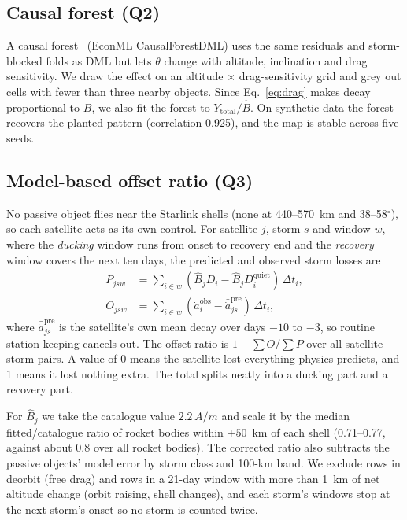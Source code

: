 \subsection{Causal forest (Q2)}
A causal forest~\cite{wager2018forest,athey2019grf} (EconML CausalForestDML) uses the same
residuals and storm-blocked folds as DML but lets $\theta$ change with altitude, inclination and
drag sensitivity. We draw the effect on an altitude $\times$ drag-sensitivity grid and grey out
cells with fewer than three nearby objects. Since Eq.~\eqref{eq:drag} makes decay proportional
to $B$, we also fit the forest to $Y_{\text{total}}/\hat B$. On synthetic data the forest recovers the planted pattern
(correlation 0.925), and the map is stable across five seeds.

\subsection{Model-based offset ratio (Q3)}
No passive object flies near the Starlink shells (none at 440--570~km and 38--58$^\circ$), so
each satellite acts as its own control. For satellite $j$, storm $s$ and
window $w$, where the \emph{ducking} window runs from onset to recovery end and the
\emph{recovery} window covers the next ten days, the predicted and observed storm losses are
\begin{align}
P_{jsw} &= \textstyle\sum_{i\in w} (\hat B_j D_i - \hat B_j D_i^{\text{quiet}})\,\Delta t_i,\\
O_{jsw} &= \textstyle\sum_{i\in w} (\dot a_i^{\text{obs}} - \bar{\dot a}_{js}^{\text{pre}})\,\Delta t_i,
\end{align}
where $\bar{\dot a}^{\text{pre}}_{js}$ is the satellite's own mean decay over days $-10$ to
$-3$, so routine station keeping cancels out. The offset ratio is $1 - \sum O / \sum P$ over all
satellite--storm pairs. A value of 0 means the satellite lost everything physics predicts, and 1
means it lost nothing extra. The total splits neatly into a ducking part and a recovery part.

For $\hat B_j$ we take the catalogue value $2.2\,A/m$ and scale it by the median fitted/catalogue
ratio of rocket bodies within $\pm50$~km of each shell (0.71--0.77, against about 0.8 over all
rocket bodies). The corrected ratio also subtracts the passive objects' model error by storm
class and 100-km band. We exclude rows in deorbit (free drag) and rows in a 21-day window with
more than 1~km of net altitude change (orbit raising, shell changes), and each storm's windows
stop at the next storm's onset so no storm is counted twice.

